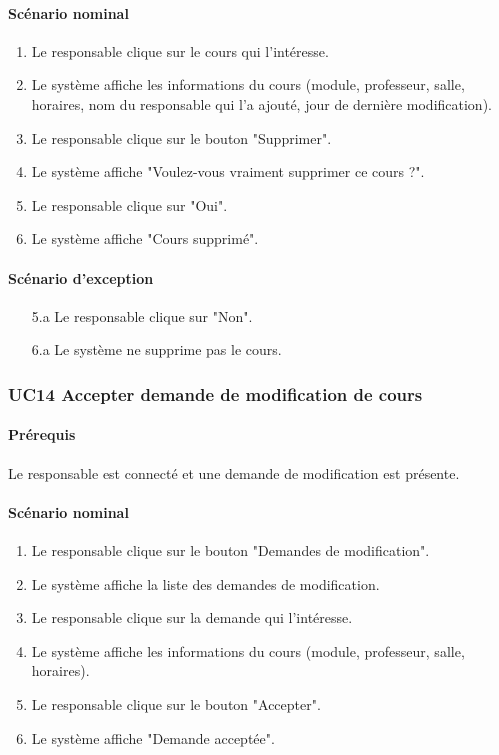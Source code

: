 \documentclass[a4paper,12pt]{article}
\begin{document}
\paragraph{Scénario nominal}
\begin{enumerate}
    \item Le responsable clique sur le cours qui l'intéresse.
    \item Le système affiche les informations du cours (module, professeur, salle, horaires, nom du responsable qui l'a ajouté, jour de dernière modification).
    \item Le responsable clique sur le bouton "Supprimer".
    \item Le système affiche "Voulez-vous vraiment supprimer ce cours ?".
    \item Le responsable clique sur "Oui".
    \item Le système affiche "Cours supprimé".
\end{enumerate}

\paragraph{Scénario d'exception}
\begin{enumerate}
    \item[5.a] Le responsable clique sur "Non".
    \item[6.a] Le système ne supprime pas le cours.
\end{enumerate}

\subsubsection{UC14 Accepter demande de modification de cours}
\paragraph{Prérequis} Le responsable est connecté et une demande de modification est présente.

\paragraph{Scénario nominal}
\begin{enumerate}
    \item Le responsable clique sur le bouton "Demandes de modification".
    \item Le système affiche la liste des demandes de modification.
    \item Le responsable clique sur la demande qui l'intéresse.
    \item Le système affiche les informations du cours (module, professeur, salle, horaires).
    \item Le responsable clique sur le bouton "Accepter".
    \item Le système affiche "Demande acceptée".
\end{enumerate}
\end{document}
